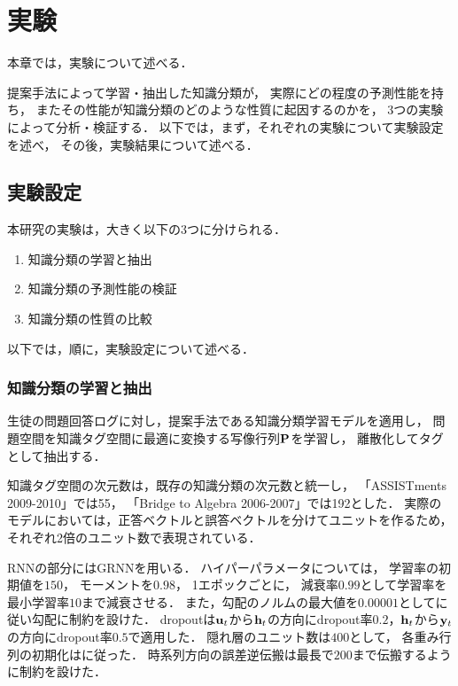 \chapter{実験}
\label{chap:result}
\fancyhf{}
\rhead{\thepage}
\cfoot{\thepage}


本章では，実験について述べる．

提案手法によって学習・抽出した知識分類が，
実際にどの程度の予測性能を持ち，
またその性能が知識分類のどのような性質に起因するのかを，
3つの実験によって分析・検証する．
以下では，まず，それぞれの実験について実験設定を述べ，
その後，実験結果について述べる．


\section{実験設定}

本研究の実験は，大きく以下の3つに分けられる．
\begin{enumerate}
	\item 知識分類の学習と抽出
	\item 知識分類の予測性能の検証
	\item 知識分類の性質の比較
\end{enumerate}
以下では，順に，実験設定について述べる．


\subsection{知識分類の学習と抽出}
\label{sec:section}
生徒の問題回答ログに対し，提案手法である知識分類学習モデルを適用し，
問題空間を知識タグ空間に最適に変換する写像行列${\bf P}$を学習し，
離散化してタグとして抽出する．

知識タグ空間の次元数は，既存の知識分類の次元数と統一し，
「ASSISTments 2009-2010」では55，
「Bridge to Algebra 2006-2007」では192とした．
実際のモデルにおいては，正答ベクトルと誤答ベクトルを分けてユニットを作るため，
それぞれ2倍のユニット数で表現されている．

RNNの部分にはGRNNを用いる．
ハイパーパラメータについては，
学習率の初期値を$150$，
モーメントを$0.98$，
1エポックごとに，
減衰率$0.99$として学習率を最小学習率$10$まで減衰させる．
また，勾配のノルムの最大値を$0.00001$として\cite{pascanu2013difficulty}に従い勾配に制約を設けた．
dropoutは${\bf u}_t$から${\bf h}_t$の方向にdropout率$0.2$，${\bf h}_t$から${\bf y}_t$の方向にdropout率$0.5$で適用した．
隠れ層のユニット数は$400$として，
各重み行列の初期化は\cite{glorot2010understanding}に従った．
時系列方向の誤差逆伝搬は最長で$200$まで伝搬するように制約を設けた．

